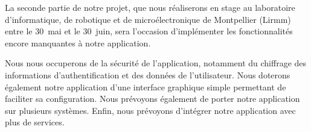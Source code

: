 La seconde partie de notre projet, que nous réaliserons en stage au laboratoire d'informatique, de robotique et de microélectronique de Montpellier (Lirmm) entre le 30~mai et le 30~juin, sera l'occasion d'implémenter les fonctionnalités encore manquantes à notre application.

Nous nous occuperons de la sécurité de l'application, notamment du chiffrage des informations d'authentification et des données de l'utilisateur. Nous doterons également notre application d'une interface graphique simple permettant de faciliter sa configuration. Nous prévoyons également de porter notre application sur plusieurs systèmes. Enfin, nous prévoyons d'intégrer notre application avec plus de services.
